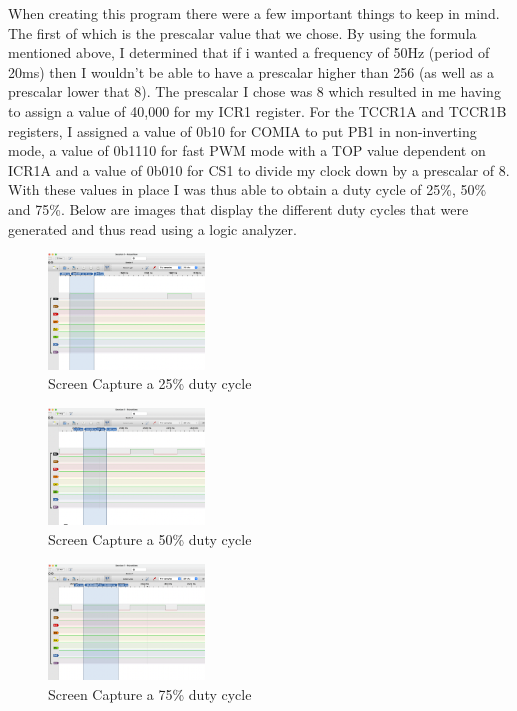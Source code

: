 \documentclass[11pt,pdftex,portrait,letterpaper]{article}
\begin{document}
	When creating this program there were a few important things to keep in mind. The first of which is the prescalar value that we chose. By using the formula mentioned above, I determined that if i wanted a frequency of 50Hz (period of 20ms) then I wouldn't be able to have a prescalar higher than 256 (as well as a prescalar lower that 8). The prescalar I chose was 8 which resulted in me having to assign a value of 40,000 for my ICR1 register. For the TCCR1A and TCCR1B registers, I assigned a value of 0b10 for COMIA to put PB1 in non-inverting mode, a value of 0b1110 for fast PWM mode with a TOP value dependent on ICR1A and a value of 0b010 for CS1 to divide my clock down by a prescalar of 8. With these values in place I was thus able to obtain a duty cycle of 25\%, 50\% and 75\%.
	Below are images that display the different duty cycles that were generated and thus read using a logic analyzer.
\pagebreak
	\begin{figure}[h]
		\centering
		\includegraphics[width=0.37\textwidth]{./proj3_25DS}	%
		\caption{Screen Capture a 25\% duty cycle}
		\label{f:fig1}	%
	\end{figure}
	\begin{figure}[h]
	\centering
	\includegraphics[width=0.37\textwidth]{./proj3_50DS}	%
	\caption{Screen Capture a 50\% duty cycle}
	\label{f:fig1}	%
	\end{figure}
	\begin{figure}[h]
	\centering
	\includegraphics[width=0.37\textwidth]{./proj3_75DS}	%
	\caption{Screen Capture a 75\% duty cycle}
	\label{f:fig1}	%
	\end{figure}
\pagebreak
\end{document}
